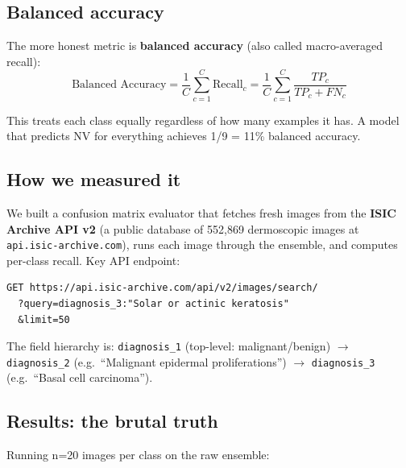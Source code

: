 \documentclass[12pt,a4paper]{article}
\begin{document}
\subsection{Balanced accuracy}

The more honest metric is \textbf{balanced accuracy} (also called macro-averaged recall):
\[
\text{Balanced Accuracy} = \frac{1}{C} \sum_{c=1}^{C} \text{Recall}_c
  = \frac{1}{C} \sum_{c=1}^{C} \frac{TP_c}{TP_c + FN_c}
\]

This treats each class equally regardless of how many examples it has. A model that predicts
NV for everything achieves 1/9 = 11\% balanced accuracy.

\subsection{How we measured it}

We built a confusion matrix evaluator that fetches fresh images from the
\textbf{ISIC Archive API v2} (a public database of 552,869 dermoscopic images at
\texttt{api.isic-archive.com}), runs each image through the ensemble, and computes per-class
recall. Key API endpoint:

\begin{lstlisting}
GET https://api.isic-archive.com/api/v2/images/search/
  ?query=diagnosis_3:"Solar or actinic keratosis"
  &limit=50
\end{lstlisting}

The field hierarchy is: \texttt{diagnosis\_1} (top-level: malignant/benign) $\to$
\texttt{diagnosis\_2} (e.g.\ ``Malignant epidermal proliferations'') $\to$
\texttt{diagnosis\_3} (e.g.\ ``Basal cell carcinoma'').

\subsection{Results: the brutal truth}

Running n=20 images per class on the raw ensemble:
\end{document}
